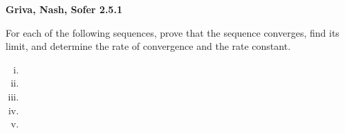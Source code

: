 \textbf{Griva, Nash, Sofer 2.5.1}

For each of the following sequences, prove that the sequence converges, find its limit, and determine the rate of
convergence and the rate constant.

\begin{enumerate}[(i)]
  \item 
  \pagebreak
  \item 
  \pagebreak
  \item 
  \pagebreak
  \item 
  \pagebreak
  \item 
\end{enumerate}
